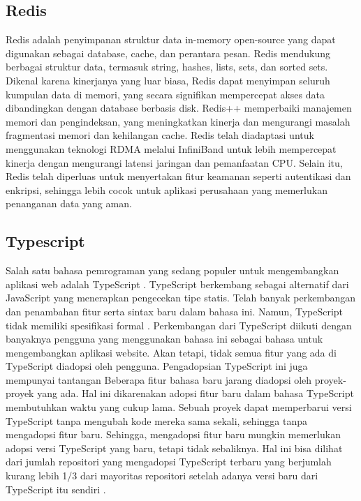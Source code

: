 \subsection{Redis}
Redis adalah penyimpanan struktur data in-memory open-source yang dapat digunakan sebagai database, cache, dan perantara pesan. Redis mendukung berbagai struktur data, termasuk string, hashes, lists, sets, dan sorted sets. Dikenal karena kinerjanya yang luar biasa, Redis dapat menyimpan seluruh kumpulan data di memori, yang secara signifikan mempercepat akses data dibandingkan dengan database berbasis disk. Redis++ memperbaiki manajemen memori dan pengindeksan, yang meningkatkan kinerja dan mengurangi masalah fragmentasi memori dan kehilangan cache\parencite{Zhang2018}. Redis telah diadaptasi untuk menggunakan teknologi RDMA melalui InfiniBand untuk lebih mempercepat kinerja dengan mengurangi latensi jaringan dan pemanfaatan CPU\parencite{Tang2017}. Selain itu, Redis telah diperluas untuk menyertakan fitur keamanan seperti autentikasi dan enkripsi, sehingga lebih cocok untuk aplikasi perusahaan yang memerlukan penanganan data yang aman\parencite{Zaki2015}.

\subsection{Typescript}
Salah satu bahasa pemrograman yang sedang populer untuk mengembangkan aplikasi web adalah TypeScript \parencite{Thu2021}.  TypeScript berkembang sebagai alternatif dari JavaScript yang menerapkan pengecekan tipe statis. Telah banyak perkembangan dan penambahan fitur serta sintax baru dalam bahasa ini. Namun, TypeScript tidak memiliki spesifikasi formal \parencite{Scarsbrook2023}. Perkembangan dari TypeScript diikuti dengan banyaknya pengguna yang menggunakan bahasa ini sebagai bahasa untuk mengembangkan aplikasi website. Akan tetapi, tidak semua fitur yang ada di TypeScript diadopsi oleh pengguna. Pengadopsian TypeScript ini juga mempunyai tantangan \parencite{Thu2021} Beberapa fitur bahasa baru jarang diadopsi oleh proyek-proyek yang ada. Hal ini dikarenakan adopsi fitur baru dalam bahasa TypeScript membutuhkan waktu yang cukup lama. Sebuah proyek dapat memperbarui versi TypeScript tanpa mengubah kode mereka sama sekali, sehingga tanpa mengadopsi fitur baru. Sehingga, mengadopsi fitur baru mungkin memerlukan adopsi versi TypeScript yang baru, tetapi tidak sebaliknya. Hal ini bisa dilihat dari jumlah repositori yang mengadopsi TypeScript terbaru yang berjumlah kurang lebih 1/3 dari mayoritas repositori setelah adanya versi baru dari TypeScript itu sendiri \parencite{Scarsbrook2023}.
